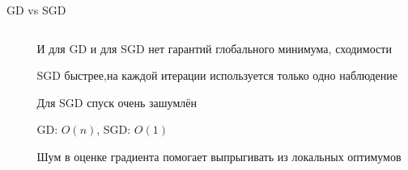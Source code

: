 \documentclass[notes,12pt, aspectratio=169]{beamer}
\newenvironment{wideitemize}{\itemize\addtolength{\itemsep}{10pt}}{\enditemize}
\begin{document}
\begin{frame}{GD vs SGD}
\begin{columns}[T] %
	\begin{column}{.5\textwidth}
	\end{column}%
	\hfill%
	\begin{column}{.5\textwidth}
		\begin{wideitemize}
			\item И для GD и для SGD нет гарантий глобального минимума, сходимости
			\item SGD быстрее,на каждой итерации используется только одно наблюдение
			\item Для SGD спуск очень зашумлён 
			\item  GD: $O(n)$, SGD: $O(1)$
			\item Шум в оценке градиента помогает выпрыгивать из локальных оптимумов
		\end{wideitemize}
	\end{column}%
\end{columns}
\end{frame}
\end{document}
